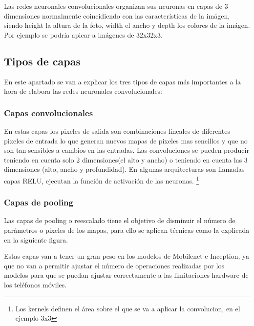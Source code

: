 
Las redes neuronales convolucionales organizan sus neuronas en capas de 3 dimensiones normalmente coincidiendo con las características de la imágen, siendo height la altura de la foto, width el ancho y depth los colores de la imágen. Por ejemplo se podría apicar a imágenes de 32x32x3.

\subsection{Tipos de capas}

En este apartado se van a explicar los tres tipos de capas más importantes a la hora de elabora las redes neuronales convolucionales:
\subsubsection{Capas convolucionales}

En estas capas los pixeles de salida son combinaciones lineales de diferentes pixeles de entrada lo que generan nuevos mapas de pixeles mas sencillos y que no son tan sensibles a cambios en las entradas. Las convoluciones se pueden producir teniendo en cuenta solo 2 dimensiones(el alto y ancho) o teniendo en cuenta las 3 dimensiones (alto, ancho y profundidad). En algunas arquitecturas son llamadas capas RELU, ejecutan la función de activación de las neuronas.
  \footnote{Los kernels definen el área sobre el que se va a aplicar la convolucion, en el ejemplo 3x3}

\subsubsection{Capas de pooling}

Las capas de pooling o reescalado tiene el objetivo de disminuir el número de parámetros o pixeles de los mapas, para ello se aplican técnicas como la explicada en la siguiente figura.

Estas capas van a tener un gran peso en los modelos de Mobilenet e Inception, ya que no van a permitir ajustar el número de operaciones realizadas por los modelos para que se puedan ajustar correctamente a las limitaciones hardware de los teléfonos móviles.


